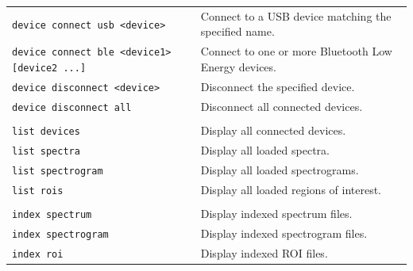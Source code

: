 \begin{longtable}{>{\ttfamily}p{} p{}}
    \texttt{device connect usb <device>} &
        Connect to a USB device matching the specified name. \\

    \texttt{device connect ble <device1> [device2 ...]} &
        Connect to one or more Bluetooth Low Energy devices. \\

    \texttt{device disconnect <device>} &
        Disconnect the specified device. \\

    \texttt{device disconnect all} &
        Disconnect all connected devices. \\

    \hline


    \multicolumn{2}{l}{\textbf{Resource Listing}} \\

    \texttt{list devices} &
        Display all connected devices. \\

    \texttt{list spectra} &
        Display all loaded spectra. \\

    \texttt{list spectrogram} &
        Display all loaded spectrograms. \\

    \texttt{list rois} &
        Display all loaded regions of interest. \\

    \hline


    \multicolumn{2}{l}{\textbf{Indexes}} \\

    \texttt{index spectrum} &
        Display indexed spectrum files. \\

    \texttt{index spectrogram} &
        Display indexed spectrogram files. \\

    \texttt{index roi} &
        Display indexed ROI files. \\

    \hline



\end{longtable}
